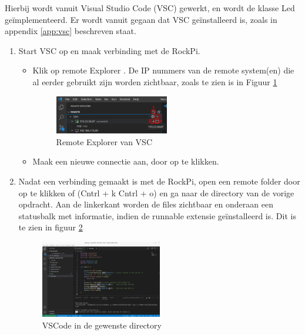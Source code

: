 Hierbij wordt vanuit Visual Studio Code (VSC) gewerkt, en wordt de klasse Led geïmplementeerd. Er wordt vanuit gegaan dat VSC geïnstalleerd is, zoals in appendix  \ref{app:vsc} beschreven staat.  
\begin{enumerate}
	\item Start VSC op en maak verbinding met de RockPi.
	\begin{itemize}
		\item Klik op remote Explorer . De IP nummers van de remote system(en) die al eerder gebruikt zijn worden zichtbaar, zoals te zien is in Figuur \ref{fig:remNr}
		\begin{figure}[h!]
			\centering
			\begin{center} 	
				\includegraphics[width=0.5\textwidth]{figuren/remoteExplorer2}
				\caption{Remote Explorer van VSC}
				\label{fig:remNr}   
			\end{center}
		\end{figure}
				 
		\item  Maak een nieuwe connectie aan, door op  te klikken.

      \end{itemize}
      
      \item Nadat een verbinding gemaakt is met de RockPi, open een remote folder door op  te klikken of (Cntrl + k Cntrl + o) en ga naar de directory van de vorige opdracht. Aan de linkerkant worden de files zichtbaar en onderaan een statusbalk met informatie, indien de runnable extensie  geïnstalleerd is. Dit is te zien in figuur \ref{fig:vncOp}
  		\begin{figure}[h!]
  	\centering
  	\begin{center} 	
  		\includegraphics[width=0.5\textwidth]{figuren/vncSchermOp1}
  		\caption{VSCode in de gewenste directory}
  		\label{fig:vncOp}   
  	\end{center}
  \end{figure}    


\end{enumerate}
